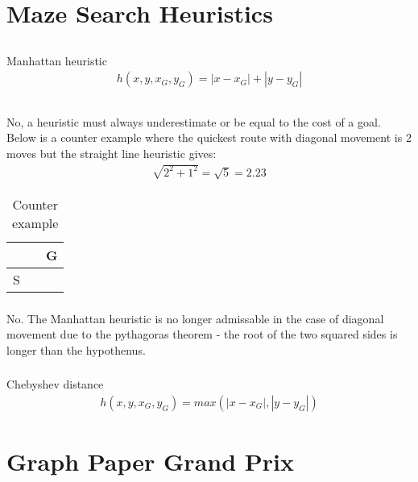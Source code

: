 \documentclass[12pt]{article}
\begin{document}
\section{Maze Search Heuristics}
\subsection{}
Manhattan heuristic
\begin{gather*}
  h(x,y,x_G,y_G)= |x-x_G| + |y-y_G|
\end{gather*}

\subsection{}
\subsubsection{}
No, a heuristic must always underestimate or be equal to the cost of a goal. Below is a counter example where the quickest route with diagonal movement is 2 moves but the straight line heuristic gives:
\begin{align*}
  \sqrt{2^2 + 1^2} = \sqrt{5} = 2.23
\end{align*}
\begin{table}[h]
\centering
\caption{Counter example}
\label{my-label}
\begin{tabular}{|l|l|l|}
\hline
  &  & G \\ \hline
S &  &   \\ \hline
\end{tabular}
\end{table}

\subsubsection{}
No. The Manhattan heuristic is no longer admissable in the case of diagonal movement due to the pythagoras theorem - the root of the two squared sides is longer than the hypothenus.
\subsubsection{}
Chebyshev distance
\begin{gather*}
  h(x,y,x_G,y_G)= max(|x-x_G|, |y-y_G|)
\end{gather*}

\newpage

\section{Graph Paper Grand Prix}
\end{document}
